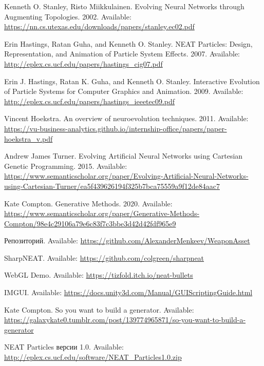 \begin{thebibliography}{1}

     Kenneth O. Stanley, Risto Miikkulainen. \flqq Evolving Neural Networks through Augmenting Topologies\frqq. 2002. Available: \url{https://nn.cs.utexas.edu/downloads/papers/stanley.ec02.pdf}

     Erin Hastings, Ratan Guha, and Kenneth O. Stanley. \flqq NEAT Particles: Design, Representation, and Animation of Particle System Effects\frqq. 2007. Available: \url{http://eplex.cs.ucf.edu/papers/hastings_cig07.pdf}

     Erin J. Hastings, Ratan K. Guha, and Kenneth O. Stanley. \flqq Interactive Evolution of Particle Systems for Computer Graphics and Animation\frqq. 2009. Available: \url{http://eplex.cs.ucf.edu/papers/hastings_ieeetec09.pdf}

     Vincent Hoekstra. \flqq An overview of neuroevolution techniques\frqq. 2011. Available: \url{https://vu-business-analytics.github.io/internship-office/papers/paper-hoekstra_v.pdf}

     Andrew James Turner. \flqq Evolving Artificial Neural Networks using Cartesian Genetic Programming\frqq. 2015. Available: \url{https://www.semanticscholar.org/paper/Evolving-Artificial-Neural-Networks-using-Cartesian-Turner/ea5f439626194f325b7bca75559a9f12de84aac7}

     Kate Compton. \flqq Generative Methods\frqq. 2020. Available: \url{https://www.semanticscholar.org/paper/Generative-Methods-Compton/98e4c29106a79e6c83f7c3bbe3d42d42fdf965e9}

     Репозиторий. Available: \url{https://github.com/AlexanderMenkeev/WeaponAsset}

     SharpNEAT. Available: \url{https://github.com/colgreen/sharpneat}

     WebGL Demo. Available: \url{https://tizfold.itch.io/neat-bullets}

     IMGUI. Available: \url{https://docs.unity3d.com/Manual/GUIScriptingGuide.html}

     Kate Compton. \flqq So you want to build a generator\frqq. Available: \url{https://galaxykate0.tumblr.com/post/139774965871/so-you-want-to-build-a-generator}

     NEAT Particles версии 1.0. Available: \url{http://eplex.cs.ucf.edu/software/NEAT_Particles1.0.zip}


\end{thebibliography}
